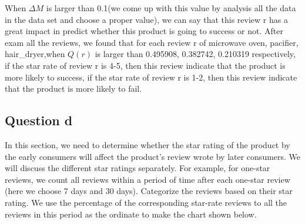 \documentclass[12pt]{mcmthesis}
\begin{document}
When $\Delta M$ is larger than 0.1(we come up with this value by analysis all the data in the data set and choose a proper value), we can say that this review r has a great impact in predict whether this product is going to success or not. After exam all the reviews, we found that for each review r of microwave oven, pacifier, hair\_dryer,when $Q(r)$ is larger than 0.495908, 0.382742, 0.210319 respectively, if the star rate of review r is 4-5, then this review indicate that the product is more likely to success, if the star rate of review r is 1-2, then this review indicate that the product is more likely to fail.

\subsection{Question d}
In this section, we need to determine whether the star rating of the product by the early consumers will affect the product's review wrote by later consumers. We will discuss the different star ratings separately. For example, for one-star reviews, we count all reviews within a period of time after each one-star review (here we choose 7 days and 30 days). Categorize the reviews based on their star rating. We use the percentage of the corresponding star-rate reviews to all the reviews in this period as the ordinate to make the chart shown below.
\end{document}
